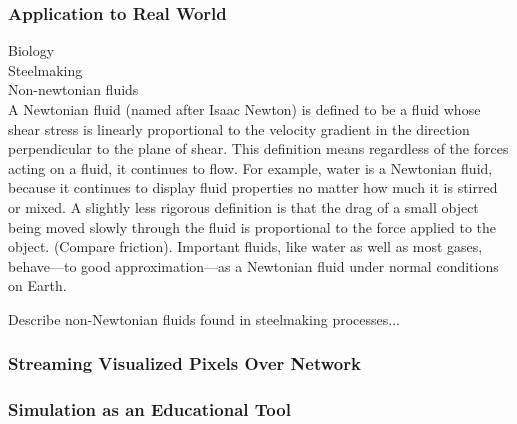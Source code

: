 \subsubsection{Application to Real World}

Biology \\
Steelmaking \\
Non-newtonian fluids \\



A Newtonian fluid (named after Isaac Newton) is defined to be a fluid whose shear stress is linearly proportional to the velocity gradient in the direction perpendicular to the plane of shear. This definition means regardless of the forces acting on a fluid, it continues to flow. For example, water is a Newtonian fluid, because it continues to display fluid properties no matter how much it is stirred or mixed. A slightly less rigorous definition is that the drag of a small object being moved slowly through the fluid is proportional to the force applied to the object. (Compare friction). Important fluids, like water as well as most gases, behave—to good approximation—as a Newtonian fluid under normal conditions on Earth.

Describe non-Newtonian fluids found in steelmaking processes...

\subsubsection{Streaming Visualized Pixels Over Network}

\subsubsection{Simulation as an Educational Tool}
%
%


